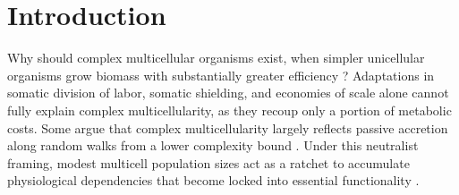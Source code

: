 



\section{Introduction}

Why should complex multicellular organisms exist, when simpler unicellular organisms grow biomass with substantially greater efficiency \citep{lynch2024bioenergetic}?
Adaptations in somatic division of labor, somatic shielding, and economies of scale \unskip\citep{Saunders1976,corning2015synergistic,niklas2014evolutionary,Bell1997,willensdorfer2009evolution,koschwanez2013improved,gerhart1997cells,dawkins1976selfish,cooper2018division} alone cannot fully explain complex multicellularity, as they recoup only a portion of metabolic costs.
Some argue that complex multicellularity largely reflects passive accretion along random walks from a lower complexity bound \citep{Gould1988,gould1990wonderful,gould2011full,mcshea2010biology,Lehman2010,Miconi2008}.
Under this neutralist framing, modest multicell population sizes act as a ratchet to accumulate physiological dependencies that become locked into essential functionality \citep{lynch2003origins,Smith1972,stoltzfus1999possibility,muozgmez2021constructive,Liard2020,libby2014ratcheting}.

